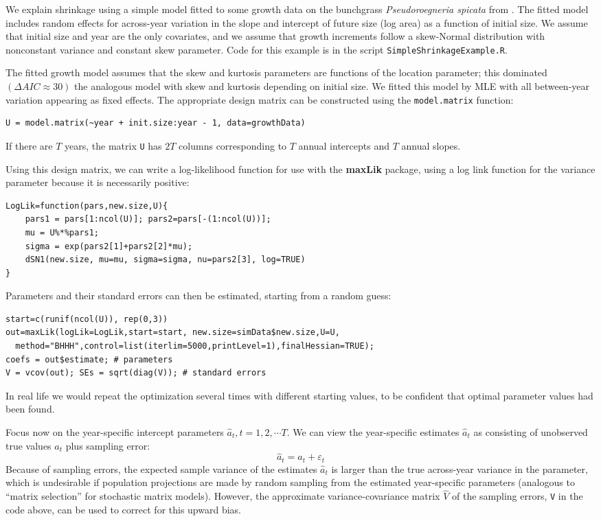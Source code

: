 \documentclass[12pt]{article}
\newcommand{\be}{\begin{equation}}
\newcommand{\ee}{\end{equation}}
\begin{document}
\begin{spacing}{1.35}
We explain shrinkage using a simple model fitted to some growth data 
on the bunchgrass \emph{Pseudoroegneria spicata} from \cite{adler-weak-dryad}. 
The fitted model includes random effects for across-year variation in the slope and 
intercept of future size (log area) as a function of initial size. We assume that initial size 
and year are the only covariates, and we assume that growth increments 
follow a skew-Normal distribution with nonconstant variance and constant skew parameter. 
Code for this example is in the script \texttt{SimpleShrinkageExample.R}. 

The fitted growth model assumes that the skew and kurtosis parameters are functions
of the location parameter; this dominated $(\Delta AIC \approx 30)$ the analogous  
model with skew and kurtosis depending on initial size.   
We fitted this model by MLE with all between-year variation appearing as fixed effects. 
The appropriate design matrix can be constructed using the \texttt{model.matrix} function: 
\begin{lstlisting}
U = model.matrix(~year + init.size:year - 1, data=growthData)
\end{lstlisting}
If there are $T$ years, the matrix \texttt{U} has $2T$ columns corresponding to $T$ annual 
intercepts and $T$ annual slopes. 

Using this design matrix, we can write a log-likelihood function for use with 
the \textbf{maxLik} package, using a log link function for the variance parameter 
because it is necessarily positive: 
\begin{lstlisting}
LogLik=function(pars,new.size,U){
    pars1 = pars[1:ncol(U)]; pars2=pars[-(1:ncol(U))];
    mu = U%*%pars1;  
    sigma = exp(pars2[1]+pars2[2]*mu);
    dSN1(new.size, mu=mu, sigma=sigma, nu=pars2[3], log=TRUE)
}
\end{lstlisting} 
Parameters and their standard errors can then be estimated, starting from a random guess: 
\begin{lstlisting}
start=c(runif(ncol(U)), rep(0,3))
out=maxLik(logLik=LogLik,start=start, new.size=simData$new.size,U=U,
  method="BHHH",control=list(iterlim=5000,printLevel=1),finalHessian=TRUE);
coefs = out$estimate; # parameters
V = vcov(out); SEs = sqrt(diag(V));	# standard errors 
\end{lstlisting}  
In real life we would repeat the optimization several times with different starting values, 
to be confident that optimal parameter values had been found. 

Focus now on the year-specific intercept parameters $\hat{a}_t, t = 1,2,\cdots T$. 
We can view the year-specific estimates $\hat{a}_t$ as consisting of unobserved true values $a_t$ plus sampling error:
\be
\hat{a}_t= a_t + \varepsilon_t 
\ee
Because of sampling errors, the expected sample variance of the estimates $\hat{a}_t$ is larger 
than the true across-year variance in the parameter, which is undesirable if population projections are made
by random sampling from the estimated year-specific parameters (analogous to ``matrix selection'' for stochastic
matrix models). However, the approximate variance-covariance matrix $\hat{V}$ of the sampling errors, \texttt{V} in the code 
above, can be used to correct for this upward bias.   


\end{spacing}
\end{document}
